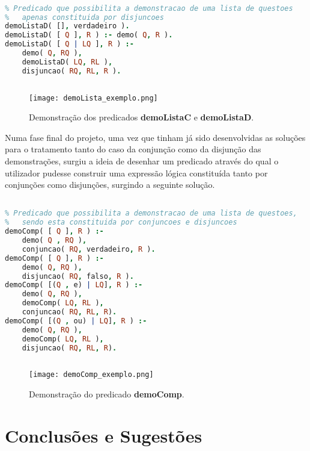 \documentclass[a4paper]{article}
\begin{document}
\begin{lstlisting}[language=Prolog, caption=Predicado \textbf{DemoListaC}.]

% Predicado que possibilita a demonstracao de uma lista de questoes
% 	apenas constituida por disjuncoes
demoListaD( [], verdadeiro ).
demoListaD( [ Q ], R ) :- demo( Q, R ).
demoListaD( [ Q | LQ ], R ) :-
	demo( Q, RQ ),
	demoListaD( LQ, RL ),
	disjuncao( RQ, RL, R ).
	
\end{lstlisting}

\begin{figure}[!h]
    \centering
    \texttt{[image: demoLista\_exemplo.png]}
    \caption{Demonstração dos predicados \textbf{demoListaC} e \textbf{demoListaD}.}
    \label{fig:demo2}
\end{figure}

Numa fase final do projeto, uma vez que tinham já sido desenvolvidas as soluções para o tratamento tanto do caso da conjunção como da disjunção das demonstrações, surgiu a ideia de desenhar um predicado através do qual o utilizador pudesse construir uma expressão lógica constituída tanto por conjunções como disjunções, surgindo a seguinte solução.

\begin{lstlisting}[language=Prolog, caption=Predicado \textbf{DemoComp}.]

% Predicado que possibilita a demonstracao de uma lista de questoes,
% 	sendo esta constituida por conjuncoes e disjuncoes
demoComp( [ Q ], R ) :- 
	demo( Q , RQ ),
	conjuncao( RQ, verdadeiro, R ).
demoComp( [ Q ], R ) :- 
	demo( Q, RQ ),
	disjuncao( RQ, falso, R ).
demoComp( [(Q , e) | LQ], R ) :-
	demo( Q, RQ ),
	demoComp( LQ, RL ),
	conjuncao( RQ, RL, R).
demoComp( [(Q , ou) | LQ], R ) :-
	demo( Q, RQ ),
	demoComp( LQ, RL ),
	disjuncao( RQ, RL, R).
	
\end{lstlisting}

\begin{figure}[!h]
    \centering
    \texttt{[image: demoComp\_exemplo.png]}
    \caption{Demonstração do predicado \textbf{demoComp}.}
    \label{fig:demo3}
\end{figure}

\newpage

\section{Conclusões e Sugestões}
\end{document}
